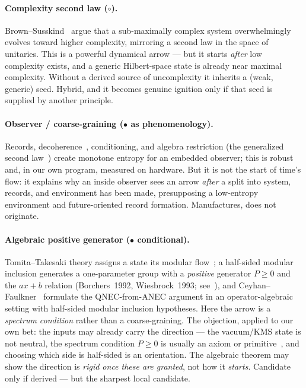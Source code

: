 \documentclass[11pt]{article}
\newcommand{\Pgen}{P}
\begin{document}
\paragraph{Complexity second law ($\circ$).} Brown--Susskind~\cite{brown} argue
that a sub-maximally complex system overwhelmingly evolves toward higher
complexity, mirroring a second law in the space of unitaries. This is a powerful
dynamical arrow --- but it starts \emph{after} low complexity exists, and a
generic Hilbert-space state is already near maximal complexity. Without a derived
source of uncomplexity it inherits a (weak, generic) seed. Hybrid, and it becomes
genuine ignition only if that seed is supplied by another principle.

\paragraph{Observer / coarse-graining ($\bullet$ as phenomenology).} Records,
decoherence~\cite{zurek}, conditioning, and algebra restriction (the generalized
second law~\cite{wall}) create monotone entropy for an embedded observer; this is
robust and, in our own program, measured on hardware. But it is not the start of
time's flow: it explains why an inside observer sees an arrow \emph{after} a split
into system, records, and environment has been made, presupposing a low-entropy
environment and future-oriented record formation. Manufactures, does not
originate.

\paragraph{Algebraic positive generator ($\bullet$ conditional).}
Tomita--Takesaki theory assigns a state its modular flow~\cite{connesrovelli}; a
half-sided modular inclusion generates a one-parameter group with a
\emph{positive} generator $\Pgen\ge 0$ and the $ax{+}b$ relation
(Borchers~1992, Wiesbrock~1993; see~\cite{borchersext}), and
Ceyhan--Faulkner~\cite{ceyhan} formulate the QNEC-from-ANEC argument in an
operator-algebraic setting with half-sided modular inclusion hypotheses. Here
the arrow is a \emph{spectrum condition} rather than a coarse-graining. The
objection, applied to our own bet: the inputs may already carry the direction ---
the vacuum/KMS state is not neutral, the spectrum condition $\Pgen\ge 0$ is
usually an axiom or primitive~\cite{buchholz}, and choosing which side is
half-sided is an orientation. The algebraic theorem may show the direction is
\emph{rigid once these are granted}, not how it \emph{starts}. Candidate only if
derived --- but the sharpest local candidate.
\end{document}
